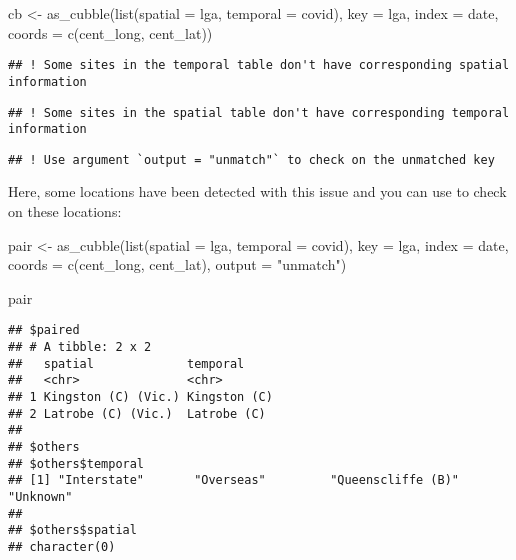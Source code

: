 \documentclass{article}
\newenvironment{Shaded}{\begin{snugshade}}{\end{snugshade}}
\newcommand{\AttributeTok}[1]{\textcolor[rgb]{0.77,0.63,0.00}{#1}}
\newcommand{\FunctionTok}[1]{\textcolor[rgb]{0.00,0.00,0.00}{#1}}
\newcommand{\NormalTok}[1]{#1}
\newcommand{\OtherTok}[1]{\textcolor[rgb]{0.56,0.35,0.01}{#1}}
\newcommand{\StringTok}[1]{\textcolor[rgb]{0.31,0.60,0.02}{#1}}
\begin{document}
\begin{Shaded}
\begin{Highlighting}[]
\NormalTok{cb }\OtherTok{\textless{}{-}} \FunctionTok{as\_cubble}\NormalTok{(}\FunctionTok{list}\NormalTok{(}\AttributeTok{spatial =}\NormalTok{ lga, }\AttributeTok{temporal =}\NormalTok{ covid),}
                \AttributeTok{key =}\NormalTok{ lga, }\AttributeTok{index =}\NormalTok{ date, }\AttributeTok{coords =} \FunctionTok{c}\NormalTok{(cent\_long, cent\_lat))}
\end{Highlighting}
\end{Shaded}

\begin{verbatim}
## ! Some sites in the temporal table don't have corresponding spatial information
\end{verbatim}

\begin{verbatim}
## ! Some sites in the spatial table don't have corresponding temporal information
\end{verbatim}

\begin{verbatim}
## ! Use argument `output = "unmatch"` to check on the unmatched key
\end{verbatim}

Here, some locations have been detected with this issue and you can use  to check on these locations:

\begin{Shaded}
\begin{Highlighting}[]
\NormalTok{pair }\OtherTok{\textless{}{-}} \FunctionTok{as\_cubble}\NormalTok{(}\FunctionTok{list}\NormalTok{(}\AttributeTok{spatial =}\NormalTok{ lga, }\AttributeTok{temporal =}\NormalTok{ covid),}
                \AttributeTok{key =}\NormalTok{ lga, }\AttributeTok{index =}\NormalTok{ date, }\AttributeTok{coords =} \FunctionTok{c}\NormalTok{(cent\_long, cent\_lat),}
                \AttributeTok{output =} \StringTok{"unmatch"}\NormalTok{)}

\NormalTok{pair}
\end{Highlighting}
\end{Shaded}

\begin{verbatim}
## $paired
## # A tibble: 2 x 2
##   spatial             temporal    
##   <chr>               <chr>       
## 1 Kingston (C) (Vic.) Kingston (C)
## 2 Latrobe (C) (Vic.)  Latrobe (C) 
## 
## $others
## $others$temporal
## [1] "Interstate"       "Overseas"         "Queenscliffe (B)" "Unknown"         
## 
## $others$spatial
## character(0)
\end{verbatim}
\end{document}
